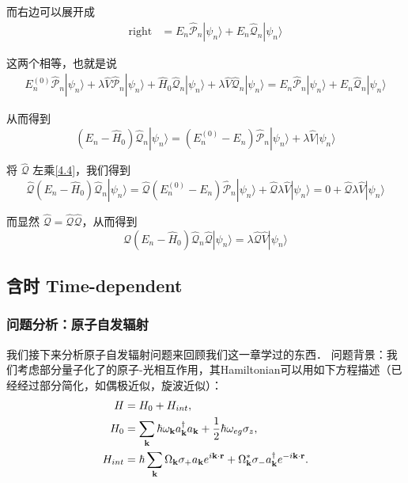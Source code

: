 而右边可以展开成
\begin{equation}
\begin{split}
\text{right} &= E_n\hat{\mathcal{P}}_n|\psi_n\rangle + E_n\hat{\mathcal{Q}}_n|\psi_n\rangle
\end{split}
\end{equation}

这两个相等，也就是说
\begin{equation}
\begin{split}
E_n^{(0)}\hat{\mathcal{P}}_n|\psi_n\rangle + \lambda \hat{V}\hat{\mathcal{P}}_n|\psi_n\rangle + \hat{H}_0\hat{\mathcal{Q}}_n|\psi_n\rangle + \lambda \hat{V}\hat{\mathcal{Q}}_n|\psi_n\rangle = E_n\hat{\mathcal{P}}_n|\psi_n\rangle + E_n\hat{\mathcal{Q}}_n|\psi_n\rangle
\end{split}
\end{equation}

从而得到
\begin{equation}\label{4.4}
(E_n - \hat{H}_0)\hat{\mathcal{Q}}_n|\psi_n\rangle = (E_n^{(0)}-E_n)\hat{\mathcal{P}}_n|\psi_n\rangle+\lambda \hat{V}|\psi_n\rangle
\end{equation}

将 $\hat{\mathcal{Q}}$ 左乘\eqref{4.4}，我们得到
\begin{equation}
\hat{\mathcal{Q}} (E_n - \hat{H}_0)\hat{\mathcal{Q}}_n|\psi_n\rangle= \hat{\mathcal{Q}}(E_n^{(0)}-E_n)\hat{\mathcal{P}}_n|\psi_n\rangle+\hat{\mathcal{Q}}\lambda \hat{V}|\psi_n\rangle = 0 +\hat{\mathcal{Q}}\lambda \hat{V}|\psi_n\rangle
\end{equation}

而显然 $\hat{\mathcal{Q}} = \hat{\mathcal{Q}}\hat{\mathcal{Q}}$，从而得到
\begin{equation}
\hat{\mathcal{Q}} (E_n - \hat{H}_0)\hat{\mathcal{Q}}_n\hat{\mathcal{Q}}|\psi_n\rangle = \lambda\hat{\mathcal{Q}} \hat{V}|\psi_n\rangle
\end{equation}

\subsection{含时 Time-dependent}

\subsubsection{问题分析：原子自发辐射}

我们接下来分析原子自发辐射问题来回顾我们这一章学过的东西． 问题背景：我们考虑部分量子化了的原子-光相互作用，其Hamiltonian可以用如下方程描述（已经经过部分简化，如偶极近似，旋波近似）：
\begin{align}
\begin{split}
H &= H_0+H_{int},\\
H_0 &= \sum_{\bf k}\hbar\omega_{\bf k}a^\dagger_{\bf k}a_{\bf k} + \frac{1}{2}\hbar\omega_{eg}\sigma_z,\\
H_{int} &= \hbar\sum_{\bf k} \Omega_{\bf k}\sigma_+ a_{\bf k}e^{i\bf k\cdot r} + \Omega_{\bf k}^*\sigma_- a_{\bf k}^\dagger e^{-i\bf k\cdot r} .
\end{split}
\end{align}

